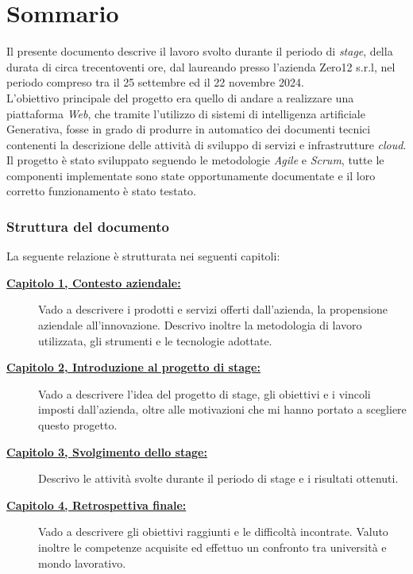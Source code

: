 \cleardoublepage
{}
{}
\begingroup
\let\clearpage\relax
\let\cleardoublepage\relax
\let\cleardoublepage\relax

\chapter*{Sommario}

\small 
Il presente documento descrive il lavoro svolto durante il periodo di \textit{stage}, della durata di circa trecentoventi ore, dal laureando \myName presso l'azienda Zero12 s.r.l, 
nel periodo compreso tra il 25 settembre ed il 22 novembre 2024. \\
L'obiettivo principale del progetto era quello di andare a realizzare una piattaforma \textit{Web}, che tramite l'utilizzo di sistemi di intelligenza artificiale Generativa, 
fosse in grado di produrre in automatico dei documenti tecnici contenenti la descrizione delle attività di sviluppo di servizi e infrastrutture \textit{cloud}. \\
Il progetto è stato sviluppato seguendo le metodologie \textit{Agile} e \textit{Scrum}, tutte le componenti implementate sono state opportunamente documentate e 
il loro corretto funzionamento è stato testato.\\ 

\subsection*{Struttura del documento}
La seguente relazione è strutturata nei seguenti capitoli:
\begin{description}
    \item[{\hyperref[cap:contesto-aziendale]{\textbf{Capitolo 1, Contesto aziendale:}}}]  Vado a descrivere i prodotti e servizi offerti dall'azienda, la propensione aziendale all'innovazione.
        Descrivo inoltre la metodologia di lavoro utilizzata, gli strumenti e le tecnologie adottate.
    \item[{\hyperref[cap:introduzione-al-progetto]{\textbf{Capitolo 2, Introduzione al progetto di stage:}}}] Vado a descrivere l'idea del progetto di stage, gli obiettivi e i vincoli imposti dall'azienda, oltre alle motivazioni che mi hanno portato a scegliere questo progetto.
    \item[{\hyperref[cap:svolgimento-dello-stage]{\textbf{Capitolo 3, Svolgimento dello stage:}}}] Descrivo le attività svolte durante il periodo di stage e i risultati ottenuti.
    \item[{\hyperref[cap:retrospettiva-finale]{\textbf{Capitolo 4, Retrospettiva finale:}}}] Vado a descrivere gli obiettivi raggiunti e le difficoltà incontrate.
    Valuto inoltre le competenze acquisite ed effettuo un confronto tra università e mondo lavorativo.
\end{description}

